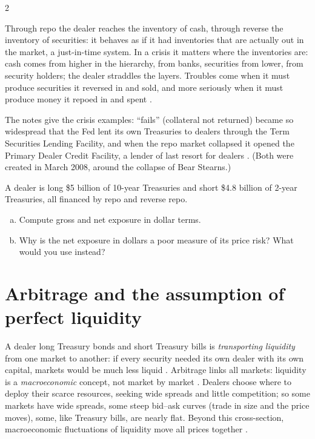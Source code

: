 \begin{paracol}{2}
\begin{intuition}
Through repo the dealer reaches the inventory of cash, through reverse the inventory of securities: it behaves as if it had inventories that are actually out in the market, a just-in-time
system. In a crisis it matters where the inventories are: cash comes from higher in the hierarchy, from banks, securities from lower, from security holders; the dealer straddles the
layers. Troubles come when it must produce securities it reversed in and sold, and more seriously when it must produce money it repoed in and spent .
\end{intuition}

\begin{coursenote}
The notes give the crisis examples: ``fails'' (collateral not returned) became so widespread that the Fed lent its own Treasuries to dealers through the Term Securities Lending Facility,
and when the repo market collapsed it opened the Primary Dealer Credit Facility, a lender of last resort for dealers . (Both were created in March 2008, around the collapse of
Bear Stearns.)
\end{coursenote}

\begin{exercise}
A dealer is long \$5 billion of 10-year Treasuries and short \$4.8 billion of 2-year Treasuries, all financed by repo and reverse repo.
\begin{enumerate}[(a)]
  \item Compute gross and net exposure in dollar terms.
  \item Why is the net exposure in dollars a poor measure of its price risk? What would you use instead?
\end{enumerate}
\end{exercise}

\section{Arbitrage and the assumption of perfect liquidity}\label{sec:dl-arbitrage}

A dealer long Treasury bonds and short Treasury bills is \emph{transporting liquidity} from one market to another: if every security needed its own dealer with its own capital, markets would
be much less liquid . Arbitrage links all markets: liquidity is a \emph{macroeconomic} concept, not market by market . Dealers choose
where to deploy their scarce resources, seeking wide spreads and little competition; so some markets have wide spreads, some steep bid--ask curves (trade in size and the price moves), some,
like Treasury bills, are nearly flat. Beyond this cross-section, macroeconomic fluctuations of liquidity move all prices together .


\end{paracol}
